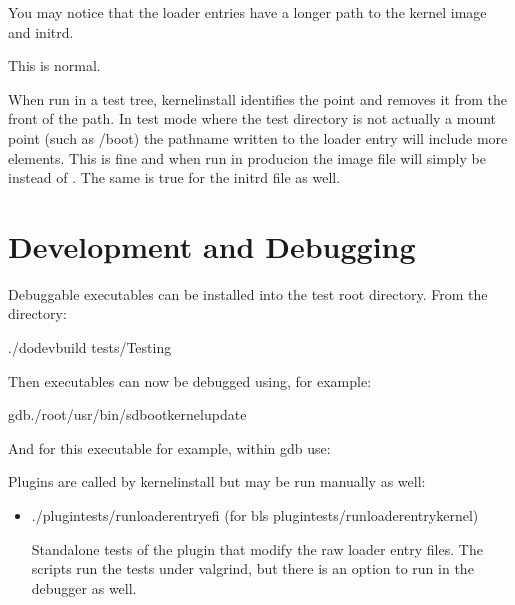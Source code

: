 \documentclass[letterpaper,11pt,english]{sphinxmanual}
\begin{document}
\sphinxAtStartPar
You may notice that the loader entries have a longer path to the kernel image and initrd.

\sphinxAtStartPar
This is normal.

\sphinxAtStartPar
When run in a test tree, kernel\sphinxhyphen{}install identifies the  point and removes it from
the front of the path. In test mode where the test directory is not actually a mount point
(such as /boot) the pathname written to the loader entry will include more elements.
This is fine and when run in producion the image file will simply be  instead of
. The same is true for the initrd file as well.


\section{Development and Debugging}
\label{\detokenize{Development:development-and-debugging}}
\sphinxAtStartPar
Debuggable executables can be installed into the test root directory.
From the  directory:

\begin{sphinxVerbatim}[commandchars=\\\{\}]
./do\PYGZhy{}dev\PYGZhy{}build
tests/Testing
\end{sphinxVerbatim}

\sphinxAtStartPar
Then executables can now be debugged using, for example:

\begin{sphinxVerbatim}[commandchars=\\\{\}]
gdb./\PYGZus{}\PYGZus{}root\PYGZus{}\PYGZus{}/usr/bin/sd\PYGZhy{}boot\PYGZhy{}kernel\PYGZhy{}update
\end{sphinxVerbatim}

\sphinxAtStartPar
And for this executable for example, within gdb use:

\begin{sphinxVerbatim}[commandchars=\\\{\}]
  
\end{sphinxVerbatim}

\sphinxAtStartPar
Plugins are called by kernel\sphinxhyphen{}install but may be run manually as well:
\begin{itemize}
\item {} 
\sphinxAtStartPar
./plugin\sphinxhyphen{}tests/run\sphinxhyphen{}loaderentry\sphinxhyphen{}efi (for bls plugin\sphinxhyphen{}tests/run\sphinxhyphen{}loaderentry\sphinxhyphen{}kernel)

\sphinxAtStartPar
Standalone tests of the plugin that modify the raw loader entry files.
The scripts run the tests under valgrind, but there is an option
to run in the debugger as well.

\end{itemize}
\end{document}
